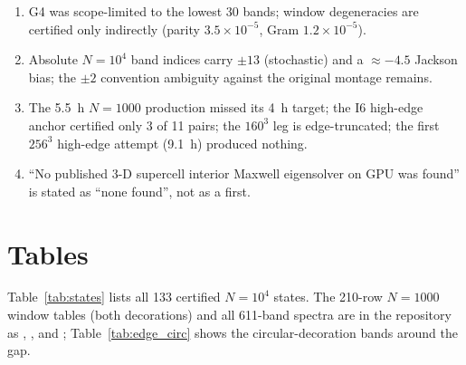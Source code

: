 \documentclass[aps,prl,preprint,superscriptaddress,longbibliography,nofootinbib]{revtex4-2}
\begin{document}
\begin{enumerate}
\item G4 was scope-limited to the lowest 30 bands; window degeneracies are certified only indirectly (parity $3.5\times10^{-5}$, Gram $1.2\times10^{-5}$).
\item Absolute $N=10^4$ band indices carry $\pm13$ (stochastic) and a $\approx-4.5$ Jackson bias; the $\pm2$ convention ambiguity against the original montage remains.
\item The 5.5~h $N=1000$ production missed its 4~h target; the I6 high-edge anchor certified only 3 of 11 pairs; the $160^3$ leg is edge-truncated; the first $256^3$ high-edge attempt (9.1~h) produced nothing.
\item ``No published 3-D supercell interior Maxwell eigensolver on GPU was found'' is stated as ``none found'', not as a first.
\end{enumerate}

\section{Tables}
Table~\ref{tab:states} lists all 133 certified $N=10^4$ states. The 210-row $N=1000$ window tables (both decorations) and all 611-band spectra are in the repository as , ,  and ; Table~\ref{tab:edge_circ} shows the circular-decoration bands around the gap.

\begin{table}
\caption{$N=1000$, circular decoration, bands 494--507 at $128^3$ ($^{\rm u}$ = unresolved fit, lower bound). Bottom-up eigenvalues (no normalization bias: their MPB parity has median $1.4\times10^{-6}$).}
\label{tab:edge_circ}

\end{table}
\begin{table}
\caption{$N=1000$, elliptical decoration, bands 494--507 at $128^3$.}
\label{tab:edge_ell}

\end{table}

{\footnotesize}
\end{document}
